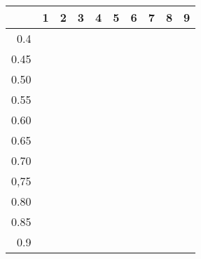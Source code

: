 \begin{table}[ht]
\centering
\begin{tabular}{rrrrrrrrrr}
  \hline
 & 1 & 2 & 3 & 4 & 5 & 6 & 7 & 8 & 9 \\ 
  \hline
0.4 &  &  &  &  &  &  &  &  &  \\ 
  0.45 &  &  &  &  &  &  &  &  &  \\ 
  0.50 &  &  &  &  &  &  &  &  &  \\ 
  0.55 &  &  &  &  &  &  &  &  &  \\ 
  0.60 &  &  &  &  &  &  &  &  &  \\ 
  0.65 &  &  &  &  &  &  &  &  &  \\ 
  0.70 &  &  &  &  &  &  &  &  &  \\ 
  0,75 &  &  &  &  &  &  &  &  &  \\ 
  0.80 &  &  &  &  &  &  &  &  &  \\ 
  0.85 &  &  &  &  &  &  &  &  &  \\ 
  0.9 &  &  &  &  &  &  &  &  &  \\ 
   \hline
\end{tabular}
\end{table}
